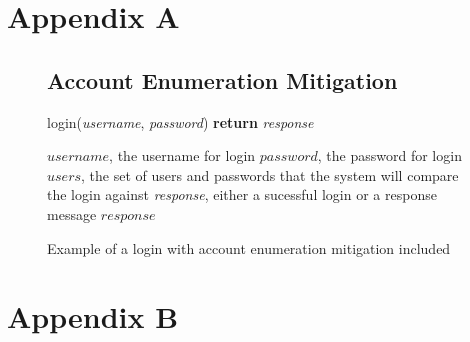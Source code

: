 \documentclass{ueacmpstyle}
\begin{document}
	\appendix
        \section{Appendix A}\label{app:A}   %
            \newpage

            \begin{figure}[ht]
                \subsection{Account Enumeration Mitigation}
                \label{sec:account-enumeration}
                \centering
                \begin{algorithm}[H]
                \caption{login(\emph{username}, \emph{password}) {\bf return} \emph{response}}
                      \begin{algorithmic}[1]
                          \Require $username$, the username for login
                          \Require $password$, the password for login
                          \Require $users$, the set of users and passwords that the system will 
                                    compare the login against
                          \Ensure \emph{response}, either a sucessful login or a response message
                              \Else
                              \EndIf
                            \Else
                            \EndIf
                          \EndFor
                          \State \Return $response$
                      \end{algorithmic}
                \end{algorithm}
                \caption{Example of a login with account enumeration mitigation included}
                \label{fig:account-enumeration}
            \end{figure}

        \section{Appendix B}\label{app:B}
\end{document}
